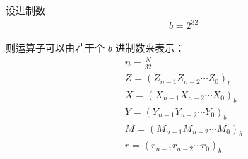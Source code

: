 \documentclass[main\_\_CN.tex]{subfiles}
\begin{document}
设进制数
\begin{gather*}
    b = 2^{32}
\end{gather*}

则运算子可以由若干个 \begin{math}b\end{math} 进制数来表示：
\begin{gather*}
    n = \frac{N}{32} \\
    Z = ( Z_{n-1} Z_{n-2} \cdots Z_{0} )_{b} \\
    X = ( X_{n-1} X_{n-2} \cdots X_{0} )_{b} \\
    Y = ( Y_{n-1} Y_{n-2} \cdots Y_{0} )_{b} \\
    M = ( M_{n-1} M_{n-2} \cdots M_{0} )_{b} \\
    \overline{r} = ( \overline{r}_{n-1} \overline{r}_{n-2} \cdots \overline{r}_{0} )_{b}
\end{gather*}
\end{document}
